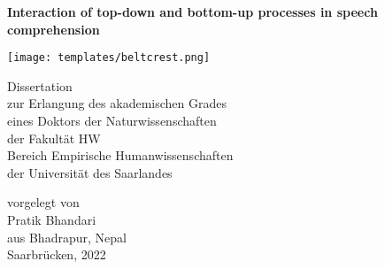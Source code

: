 \thispagestyle{empty}
\begin{center}
\Huge{\textbf{Interaction of top-down and bottom-up processes in speech comprehension}} \\

\vspace*{2cm}

\begin{center}
\texttt{[image: templates/beltcrest.png]}
\end{center}

\vspace*{2cm}

\Large
{Dissertation \\
zur Erlangung des akademischen Grades \\
eines Doktors der Naturwissenschaften \\
der Fakultät HW \\
Bereich Empirische Humanwissenschaften \\
der Universität des Saarlandes} \\

\vspace*{0.8cm}

\large{vorgelegt von} \\
\vspace*{0.3cm}
\Large{Pratik Bhandari} \\
\vspace*{0.1cm}
\large{aus Bhadrapur, Nepal \\
\vspace*{0.8cm}
Saarbrücken, 2022}

\end{center}

